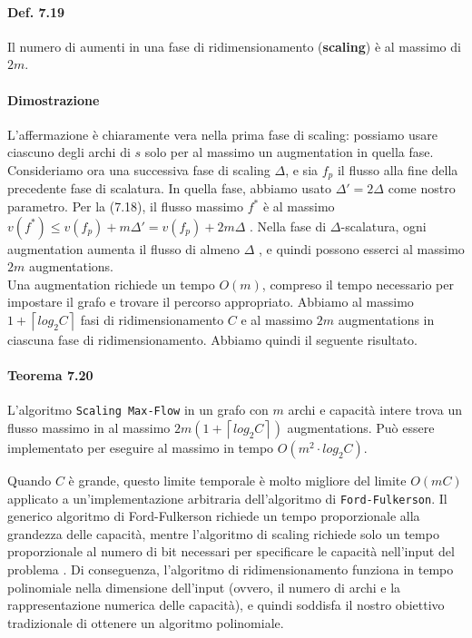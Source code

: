 \paragraph{Def. 7.19}

\begin{myblockquote}
Il numero di aumenti in una fase di ridimensionamento (\textbf{scaling})
è al massimo di $2m$.
\end{myblockquote}

\paragraph{Dimostrazione}

L'affermazione è chiaramente vera nella prima fase di scaling: possiamo
usare ciascuno degli archi di $s$ solo per al massimo un augmentation
in quella fase. Consideriamo ora una successiva fase di scaling
$\Delta$, e sia $f_p$ il flusso alla fine della precedente fase di
scalatura. In quella fase, abbiamo usato $\Delta' = 2\Delta$ come
nostro parametro. Per la (7.18), il flusso massimo $f^*$ è al massimo
$v(f^*) \le v(f_p) + m\Delta' = v(f_p) + 2m\Delta$ . Nella fase di
$\Delta$-scalatura, ogni augmentation aumenta il flusso di almeno
$\Delta$ , e quindi possono esserci al massimo $2m$ augmentations.\\

Una augmentation richiede un tempo $O(m)$, compreso il tempo
necessario per impostare il grafo e trovare il percorso appropriato.
Abbiamo al massimo $1 + \left\lceil log_2 C \right\rceil$ fasi di
ridimensionamento $C$ e al massimo $2m$ augmentations in ciascuna
fase di ridimensionamento. Abbiamo quindi il seguente risultato.

\paragraph{Teorema 7.20}

\begin{myblockquote}
L'algoritmo \texttt{Scaling\ Max-Flow} in un grafo con $m$ archi e
capacità intere trova un flusso massimo in al massimo
$2m(1 + \left\lceil log_2 C \right\rceil)$ augmentations. Può essere
implementato per eseguire al massimo in tempo $O(m^2 \cdot log_2 C)$.
\end{myblockquote}

Quando $C$ è grande, questo limite temporale è molto migliore del
limite $O(mC)$ applicato a un'implementazione arbitraria
dell'algoritmo di \texttt{Ford-Fulkerson}. Il generico algoritmo di
Ford-Fulkerson richiede un tempo proporzionale alla grandezza delle
capacità, mentre l'algoritmo di scaling richiede solo un tempo
proporzionale al numero di bit necessari per specificare le capacità
nell'input del problema . Di conseguenza, l'algoritmo di
ridimensionamento funziona in tempo polinomiale nella dimensione
dell'input (ovvero, il numero di archi e la rappresentazione numerica
delle capacità), e quindi soddisfa il nostro obiettivo tradizionale di
ottenere un algoritmo polinomiale.
